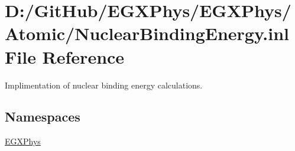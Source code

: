 \hypertarget{_nuclear_binding_energy_8inl}{}\section{D\+:/\+Git\+Hub/\+E\+G\+X\+Phys/\+E\+G\+X\+Phys/\+Atomic/\+Nuclear\+Binding\+Energy.inl File Reference}
\label{_nuclear_binding_energy_8inl}


Implimentation of nuclear binding energy calculations.  


\subsection*{Namespaces}
\begin{DoxyCompactItemize}
\item 
 \mbox{\hyperlink{namespace_e_g_x_phys}{E\+G\+X\+Phys}}
\end{DoxyCompactItemize}
